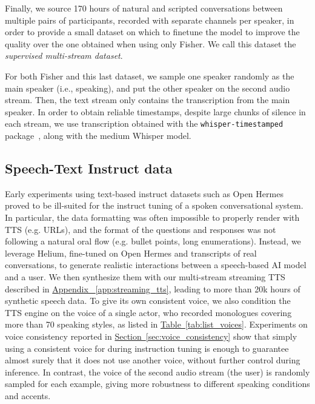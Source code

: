 Finally, we source 170 hours of natural and scripted conversations between multiple pairs of participants, recorded with separate channels per speaker, in order to provide a small dataset on which to finetune the model to improve the quality over the one obtained when using only Fisher. We call this dataset the \emph{supervised multi-stream dataset}.

For both Fisher and this last dataset, we sample one speaker randomly as the main speaker (i.e., \ours{} speaking), and put the other speaker on the second audio stream. Then, the text stream only contains 
the transcription from the main speaker. In order to obtain reliable timestamps, despite large chunks of silence in each stream, we %
use transcription obtained with the \texttt{whisper-timestamped} package~\citep{lintoai2023whispertimestamped}, along with the medium Whisper model.

\subsection{Speech-Text Instruct data}
\label{sec:instruct_data}

Early experiments using text-based instruct datasets such as Open Hermes~\citep{OpenHermes2} proved to be ill-suited for the instruct tuning of a spoken conversational system.
In particular, the data formatting was often impossible to properly render with TTS (e.g. URLs), and the format of the questions and responses was not following a natural oral flow (e.g. bullet points, long enumerations). Instead, we leverage Helium, fine-tuned on Open Hermes and transcripts of real conversations, to generate realistic interactions between a speech-based AI model and a user.
We then synthesize them with our multi-stream streaming TTS described in \hyperref[app:streaming_tts]{Appendix ~\ref{app:streaming_tts}}, leading to more than 20k hours of synthetic speech data.
To give \ours{} its own consistent voice, we also condition the TTS engine on the voice of a single actor, who recorded monologues covering more than 70 speaking styles, as listed in \hyperref[tab:list_voices]{Table~\ref{tab:list_voices}}. Experiments on voice consistency reported in \hyperref[sec:voice_consistency]{Section~\ref{sec:voice_consistency}} show that simply using a consistent voice for \ours{} during instruction tuning is enough to guarantee almost surely that it does not use another voice, without further control during inference.
In contrast, the voice of the second audio stream (the user) is randomly sampled for each example, giving more robustness to different speaking conditions and accents.

